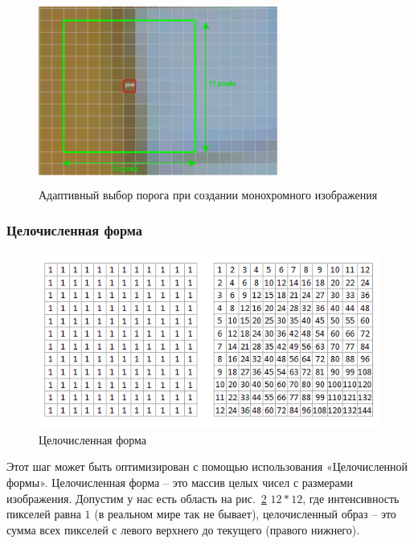 \begin{figure}[ht!]
  \centering
  \includegraphics[width=0.7\textwidth]{inc/raster/design2-2.png}
  \caption{Адаптивный выбор порога при создании монохромного изображения}
  \label{fig:fig22}
\end{figure}

\subsubsection{Целочисленная форма}
\begin{figure}[ht!]
  \centering
  \includegraphics[width=\textwidth]{inc/raster/design2-3.png}
  \caption{Целочисленная форма}
  \label{fig:fig23}
\end{figure}

Этот шаг может быть оптимизирован с помощью использования «Целочисленной формы». Целочисленная форма – это массив целых чисел с размерами изображения. Допустим у нас есть область  на рис.~\ref{fig:fig23} $12{*}12$, где интенсивность пикселей равна $1$ (в реальном мире так не бывает), целочисленный образ – это сумма всех пикселей с левого верхнего до текущего (правого нижнего).

